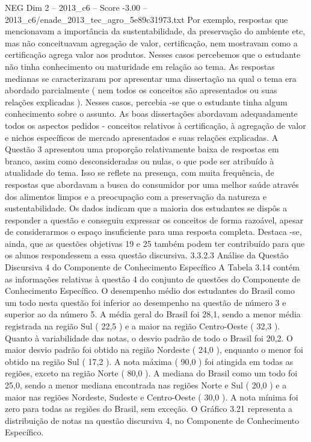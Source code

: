 \begin{textsample}{NEG Dim 2 – 2013\_c6 – Score -3.00 – 2013\_c6/enade\_2013\_tec\_agro\_5e89c31973.txt}
Por exemplo, respostas que mencionavam a importância da sustentabilidade, da preservação do ambiente etc, mas não conceituavam agregação de valor, certificação, nem mostravam como a certificação agrega valor aos produtos.
Nesses casos percebemos que o estudante não tinha conhecimento ou maturidade em relação ao tema.
As respostas medianas se caracterizaram por apresentar uma dissertação na qual o tema era abordado parcialmente ( nem todos os conceitos são apresentados ou suas relações explicadas ).
Nesses casos, percebia -se que o estudante tinha algum conhecimento sobre o assunto.
As boas dissertações abordavam adequadamente todos os aspectos pedidos - conceitos relativos à certificação, à agregação de valor e nichos específicos de mercado apresentados e suas relações explicadas.
A Questão 3 apresentou uma proporção relativamente baixa de respostas em branco, assim como desconsideradas ou nulas, o que pode ser atribuído à atualidade do tema.
Isso se reflete na presença, com muita frequência, de respostas que abordavam a busca do consumidor por uma melhor saúde através dos alimentos limpos e a preocupação com a preservação da natureza e sustentabilidade.
Os dados indicam que a maioria dos estudantes se dispôs a responder a questão e conseguiu expressar os conceitos de forma razoável, apesar de considerarmos o espaço insuficiente para uma resposta completa.
Destaca -se, ainda, que as questões objetivas 19 e 25 também podem ter contribuído para que os alunos respondessem a essa questão discursiva. 3.3.2.3 Análise da Questão Discursiva 4 do Componente de Conhecimento Específico A Tabela 3.14 contém as informações relativas à questão 4 do conjunto de questões do Componente de Conhecimento Específico.
O desempenho médio dos estudantes do Brasil como um todo nesta questão foi inferior ao desempenho na questão de número 3 e superior ao da número 5.
A média geral do Brasil foi 28,1, sendo a menor média registrada na região Sul ( 22,5 ) e a maior na região Centro-Oeste ( 32,3 ).
Quanto à variabilidade das notas, o desvio padrão de todo o Brasil foi 20,2.
O maior desvio padrão foi obtido na região Nordeste ( 24,0 ), enquanto o menor foi obtido na região Sul ( 17,2 ).
A nota máxima ( 90,0 ) foi atingida em todas as regiões, exceto na região Norte ( 80,0 ).
A mediana do Brasil como um todo foi 25,0, sendo a menor mediana encontrada nas regiões Norte e Sul ( 20,0 ) e a maior nas regiões Nordeste, Sudeste e Centro-Oeste ( 30,0 ).
A nota mínima foi zero para todas as regiões do Brasil, sem exceção.
O Gráfico 3.21 representa a distribuição de notas na questão discursiva 4, no Componente de Conhecimento Específico.

\end{textsample}
